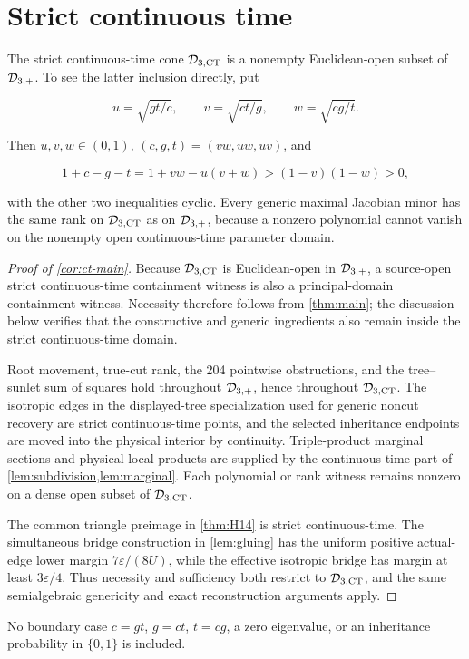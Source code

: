 \section{Strict continuous time}\label{sec:continuous-time}

The strict continuous-time cone \(\mathcal D_{3,\mathrm{CT}}\) is a nonempty Euclidean-open subset
of \(\mathcal D_{3,+}\).  To see the latter inclusion directly, put

\[
 u=\sqrt{gt/c},\qquad v=\sqrt{ct/g},\qquad w=\sqrt{cg/t}.
\]

Then \(u,v,w\in(0,1)\), \((c,g,t)=(vw,uw,uv)\), and

\[
 1+c-g-t=1+vw-u(v+w)>(1-v)(1-w)>0,
\]

with the other two inequalities cyclic.  Every generic maximal Jacobian minor
has the same rank on \(\mathcal D_{3,\mathrm{CT}}\) as on \(\mathcal D_{3,+}\), because a nonzero polynomial
cannot vanish on the nonempty open continuous-time parameter domain.

\begin{proof}[Proof of \cref{cor:ct-main}]
Because \(\mathcal D_{3,\mathrm{CT}}\) is Euclidean-open in \(\mathcal D_{3,+}\), a source-open strict
continuous-time containment witness is also a principal-domain containment
witness.  Necessity therefore follows from \cref{thm:main}; the discussion
below verifies that the constructive and generic ingredients also remain
inside the strict continuous-time domain.

Root movement, true-cut rank, the 204 pointwise obstructions, and the
tree--sunlet sum of squares hold throughout \(\mathcal D_{3,+}\), hence throughout
\(\mathcal D_{3,\mathrm{CT}}\).  The isotropic edges in the displayed-tree specialization used for
generic noncut recovery are strict continuous-time points, and the selected
inheritance endpoints are moved into the physical interior by continuity.
Triple-product marginal sections and
physical local products are supplied by the continuous-time part of
\cref{lem:subdivision,lem:marginal}.  Each polynomial or rank witness remains
nonzero on a dense open subset of \(\mathcal D_{3,\mathrm{CT}}\).

The common triangle preimage in \cref{thm:H14} is strict continuous-time.
The simultaneous bridge construction in \cref{lem:gluing} has the uniform
positive actual-edge lower margin \(7\varepsilon/(8U)\), while the effective
isotropic bridge has margin at least \(3\varepsilon/4\).  Thus necessity and sufficiency both
restrict to \(\mathcal D_{3,\mathrm{CT}}\), and the same semialgebraic genericity and exact
reconstruction arguments apply.
\end{proof}

No boundary case \(c=gt\), \(g=ct\), \(t=cg\), a zero eigenvalue, or an
inheritance probability in \(\{0,1\}\) is included.
